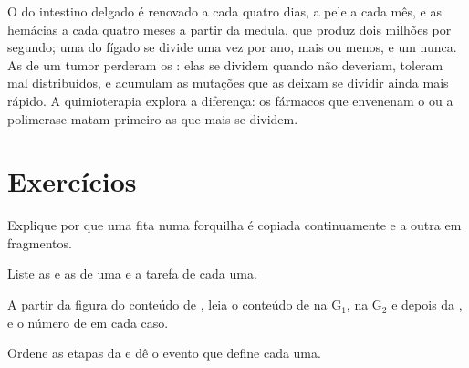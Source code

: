 \begin{example}[Renovação]\label{ex:b1:replication-mitosis:turnover}
O  do intestino delgado é renovado a cada quatro dias, a pele a
cada mês, e as hemácias a cada quatro meses a partir da medula, que
produz dois milhões por segundo; uma  do fígado se divide uma vez
por ano, mais ou menos, e um  nunca. As  de um tumor
perderam os : elas se dividem quando não deveriam,
toleram  mal distribuídos, e acumulam as mutações que as
deixam se dividir ainda mais rápido. A quimioterapia explora a
diferença: os fármacos que envenenam o  ou a polimerase matam
primeiro as  que mais se dividem.
\end{example}

\section{Exercícios}

\begin{exercise}[$\star$]\label{exo:b1:replication-mitosis:1}
Explique por que uma fita numa forquilha é copiada continuamente e a
outra em fragmentos.
\end{exercise}

\begin{exercise}[$\star$]\label{exo:b1:replication-mitosis:2}
Liste as  e as  de uma  e a
tarefa de cada uma.
\end{exercise}

\begin{exercise}[$\star$]\label{exo:b1:replication-mitosis:3}
A partir da figura do conteúdo de , leia o conteúdo de  na G$_1$,
na G$_2$ e depois da , e o número de  em cada caso.
\end{exercise}

\begin{exercise}[$\star$]\label{exo:b1:replication-mitosis:4}
Ordene as etapas da  e dê o evento que define cada uma.
\end{exercise}

